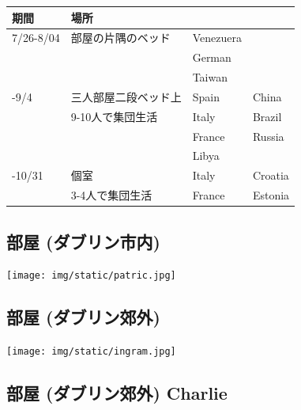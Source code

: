 \begin{center}
\begin{tabular}{llll}
期間 & 場所 &  & \\
\hline
7/26-8/04 & 部屋の片隅のベッド & Venezuera & \\
 &  & German & \\
 &  & Taiwan & \\
\hline
-9/4 & 三人部屋二段ベッド上 & Spain & China\\
 & 9-10人で集団生活 & Italy & Brazil\\
 &  & France & Russia\\
 &  & Libya & \\
\hline
-10/31 & 個室 & Italy & Croatia\\
 & 3-4人で集団生活 & France & Estonia\\
\end{tabular}
\end{center}

\subsection{部屋 (ダブリン市内)}
\label{sec-7-2}

\texttt{[image: img/static/patric.jpg]}

\subsection{部屋 (ダブリン郊外)}
\label{sec-7-3}

\texttt{[image: img/static/ingram.jpg]}

\subsection{部屋 (ダブリン郊外) Charlie}
\label{sec-7-4}

